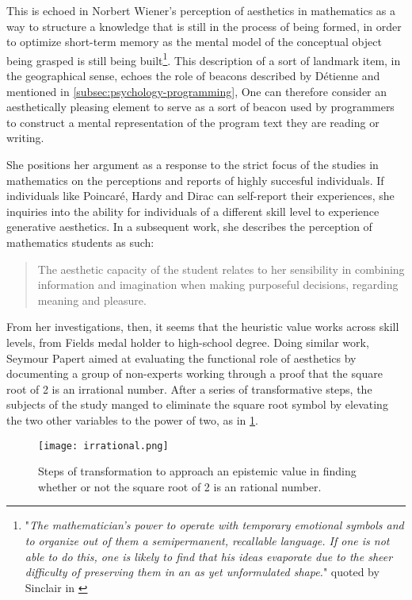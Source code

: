 This is echoed in Norbert Wiener's perception of aesthetics in mathematics as a way to structure a knowledge that is still in the process of being formed, in order to optimize short-term memory as the mental model of the conceptual object being grasped is still being built\footnote{"\emph{The mathematician's power to operate with temporary emotional symbols and to organize out of them a semipermanent, recallable language. If one is not able to do this, one is likely to find that his ideas evaporate due to the sheer difficulty of preserving them in an as yet unformulated shape.}" quoted by Sinclair in \citep{sinclair_roles_2004}}. This description of a sort of landmark item, in the geographical sense, echoes the role of beacons described by Détienne \citep{detienne_software_2012} and mentioned in \ref{subsec:psychology-programming}, One can therefore consider an aesthetically pleasing element to serve as a sort of beacon used by programmers to construct a mental representation of the program text they are reading or writing.

She positions her argument as a response to the strict focus of the studies in mathematics on the perceptions and reports of highly succesful individuals. If individuals like Poincaré, Hardy and Dirac can self-report their experiences, she inquiries into the ability for individuals of a different skill level to experience generative aesthetics. In a subsequent work, she describes the perception of mathematics students as such:

\begin{quote}
    The aesthetic capacity of the student relates to her sensibility in combining information and imagination when making purposeful decisions, regarding meaning and pleasure. \citep{sinclair_aesthetic_2011}
\end{quote}

From her investigations, then, it seems that the heuristic value works across skill levels, from Fields medal holder to high-school degree. Doing similar work, Seymour Papert aimed at evaluating the functional role of aesthetics by documenting a group of non-experts working through a proof that the square root of 2 is an irrational number. After a series of transformative steps, the subjects of the study manged to eliminate the square root symbol by elevating the two other variables to the power of two, as in \ref{graphic:irrational-proof}.

\begin{figure}
    \texttt{[image: irrational.png]}
    \caption{Steps of transformation to approach an epistemic value in finding whether or not the square root of 2 is an rational number.}
    \label{graphic:irrational-proof}
\end{figure}

